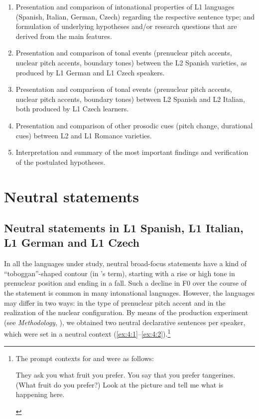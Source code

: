 \begin{enumerate}[label=(\arabic*)]
\item  Presentation and comparison of intonational properties of L1 languages (Spanish, Italian, German, Czech) regarding the respective sentence type; and formulation of underlying hypotheses and/or research questions that are derived from the main features.
\item  Presentation and comparison of tonal events (prenuclear pitch accents, nuclear pitch accents, boundary tones) between the L2 Spanish varieties, as produced by L1 German and L1 Czech speakers.
\item  Presentation and comparison of tonal events (prenuclear pitch accents, nuclear pitch accents, boundary tones) between L2 Spanish and L2 Italian, both produced by L1 Czech learners.
\item  Presentation and comparison of other prosodic cues (pitch change, durational cues) between L2 and L1 Romance varieties.
\item  Interpretation and summary of the most important findings and verification of the postulated hypotheses.
\end{enumerate}

\section{Neutral statements}\label{sec:4.1} %
\subsection{Neutral statements in L1 Spanish, L1 Italian, L1 German and L1 Czech}\label{sec:4.1.1}

In all the languages under study, neutral broad-focus statements have a kind of “toboggan”-shaped contour (in \citeauthor{Sosa1999}'s \citeyear{Sosa1999} term), starting with a rise or high tone in prenuclear position and ending in a fall. Such a decline in F0 over the course of the statement is common in many intonational languages. However, the languages may differ in two ways: in the type of prenuclear pitch accent and in the realization of the nuclear configuration. By means of the production experiment (see \textit{Methodology}, ), we obtained two neutral declarative sentences per speaker, which were set in a neutral context (\ref{ex:4:1}--\ref{ex:4:2}).\footnote{The prompt contexts for  and  were as follows:

\begin{exe}
 They ask you what fruit you prefer. You say that you prefer tangerines. (What fruit do you prefer?)
 Look at the picture and tell me what is happening here.
\end{exe}}

